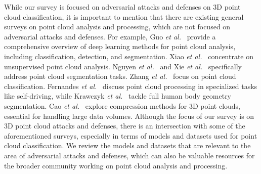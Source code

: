 \documentclass{ieeeaccess}
\def\etal{\textit{et al.}}
\begin{document}



While our survey is focused on adversarial attacks and defenses on 3D point cloud classification, it is important to mention that there are existing general surveys on point cloud analysis and processing, which are not focused on adversarial attacks and defenses. For example, 
Guo \etal~\cite{guo2020deep} provide a comprehensive overview of deep learning methods for point cloud analysis, including classification, detection, and segmentation. Xiao \etal~\cite{xiao2023unsupervised} concentrate on unsupervised point cloud analysis. Nguyen \etal~\cite{xie2020linking} and Xie \etal~\cite{xie2020linking} specifically address point cloud segmentation tasks. Zhang \etal~\cite{zhang2023deep} focus on point cloud classification. Fernandes \etal~\cite{fernandes2021point} discuss point cloud processing in specialized tasks like self-driving, while Krawczyk \etal~\cite{krawczyk2023segmentation} tackle full human body geometry segmentation. Cao \etal~\cite{cao20193d} explore compression methods for 3D point clouds, essential for handling large data volumes. Although the focus of our survey is on 3D point cloud attacks and defenses, there is an intersection with some of the aforementioned surveys, especially in terms of models and datasets used for point cloud classification. We review the models and datasets that are relevant to the area of adversarial attacks and defenses, which can also be valuable resources for the broader community working on point cloud analysis and processing.
\end{document}
